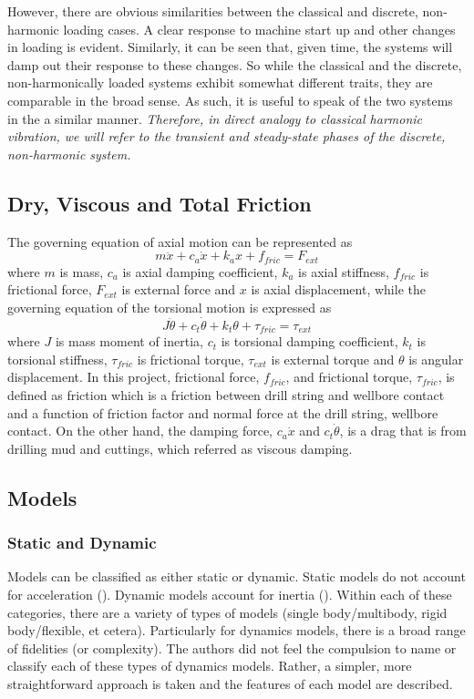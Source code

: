 However, there are obvious similarities between the classical and discrete, non-harmonic loading cases.  A clear response to machine start up and other changes in loading is evident.  Similarly, it can be seen that, given time, the systems will damp out their response to these changes. So while the classical and the discrete, non-harmonically loaded systems exhibit somewhat different traits, they are comparable in the broad sense.  As such, it is useful to speak of the two systems in the a similar manner.  \emph{Therefore, in direct analogy to classical harmonic vibration, we will refer to the transient and steady-state phases of the discrete, non-harmonic system.}

\subsection{Dry, Viscous and Total Friction}
The governing equation of axial motion can be represented as
\begin{equation}\label{eq:axial_motion_GE}
    m\ddot{x} + c_a\dot{x} + k_ax + f_{fric} = F_{ext}
\end{equation}
where $m$ is mass, $c_a$ is axial damping coefficient, $k_a$ is axial stiffness, $f_{fric}$ is frictional force, $F_{ext}$ is external force and $x$ is axial displacement, while the governing equation of the torsional motion is expressed as
\begin{equation}\label{eq:torsional_motion_GE}
    J\ddot{\theta} + c_t\dot{\theta} + k_t\theta + \tau_{fric} = \tau_{ext}
\end{equation}
where $J$ is mass moment of inertia, $c_t$ is torsional damping coefficient, $k_t$ is torsional stiffness, $\tau_{fric}$ is frictional torque, $\tau_{ext}$ is external torque and $\theta$ is angular displacement. In this project, frictional force, $f_{fric}$, and frictional torque, $\tau_{fric}$, is defined as friction which is a friction between drill string and wellbore contact and a function of friction factor and normal force at the drill string, wellbore contact. On the other hand, the damping force, $c_a\dot{x}$ and $c_t\dot{\theta}$, is a drag that is from drilling mud and cuttings, which referred as viscous damping.

\subsection{Models}
\subsubsection{Static and Dynamic}
Models can be classified as either static or dynamic.  Static models do not account for acceleration (\staticforcebalance{}).  Dynamic models account for inertia (\dynamicforcebalance{}).  Within each of these categories, there are a variety of types of models (single body/multibody, rigid body/flexible, et cetera).  Particularly for dynamics models, there is a broad range of fidelities (or complexity).  The authors did not feel the compulsion to name or classify each of these types of dynamics models.  Rather, a simpler, more straightforward approach is taken and the features of each model are described.

